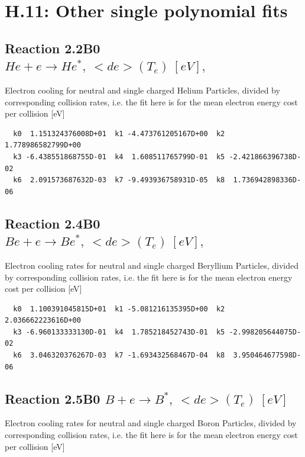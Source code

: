 \documentclass[12pt,dvipdfmx]{article}
\begin{document}
\section{H.11: Other single polynomial fits}

\subsection{
Reaction 2.2B0   $ He + e  \rightarrow He^*,    \ <de>(T_e) \ [eV], $
}

  Electron cooling for neutral and single
  charged Helium Particles, divided by corresponding collision rates,
  i.e. the fit here is for the mean electron energy cost per collision [eV]

\begin{small}\begin{verbatim}
  k0  1.151324376008D+01  k1 -4.473761205167D+00  k2  1.778986582799D+00
  k3 -6.438551868755D-01  k4  1.608511765799D-01  k5 -2.421866396738D-02
  k6  2.091573687632D-03  k7 -9.493936758931D-05  k8  1.736942898336D-06

\end{verbatim}\end{small}


\subsection{
Reaction 2.4B0  $   Be + e \rightarrow Be^*,   \ <de>(T_e)  \ [eV],$
}

  Electron cooling rates for neutral and single
  charged Beryllium Particles, divided by corresponding collision rates, i.e. the fit here is for the mean electron energy cost per collision [eV]

\begin{small}\begin{verbatim}
  k0  1.100391045815D+01  k1 -5.081216135395D+00  k2  2.036662223616D+00
  k3 -6.960133333130D-01  k4  1.785218452743D-01  k5 -2.998205644075D-02
  k6  3.046320376267D-03  k7 -1.693432568467D-04  k8  3.950464677598D-06

\end{verbatim}\end{small}
\subsection{
Reaction 2.5B0   $  B + e \rightarrow B^*,  \ <de>(T_e) \ [eV] $
}

 Electron cooling rates for neutral and single
 charged Boron Particles, divided by corresponding collision rates, i.e. the fit here is for the mean electron energy cost per collision [eV]
\end{document}
